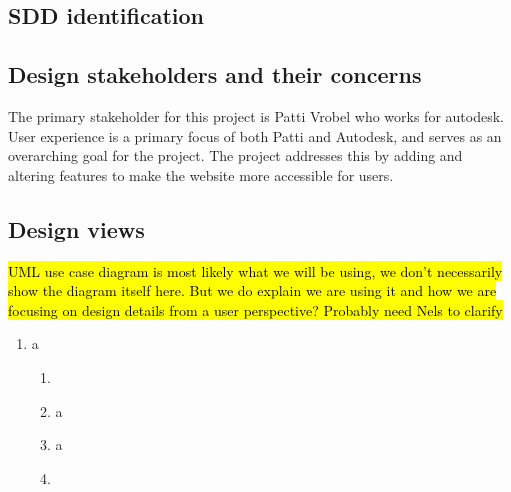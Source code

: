 \documentclass[letterpaper, 10pt, draftclsnofoot, compsoc, onecolumn]{IEEEtran}
\begin{document}
\subsection{SDD identification}
	\begin{description}
	\item{}
	\end{description}
\subsection{Design stakeholders and their concerns}
	The primary stakeholder for this project is Patti Vrobel who works for autodesk. User experience is a primary focus of both Patti and Autodesk, and serves as an overarching goal for the project. The project addresses this by adding and altering features to make the website more accessible for users.

\subsection{Design views}
	\hl{UML use case diagram is most likely what we will be using, we don't necessarily show the diagram itself here. But we do explain we are using it and how we are focusing on design details from a user perspective? Probably need Nels to clarify}
\begin{enumerate}
 		\item{a}
 			\begin{enumerate}
 				\item{}
 				\item{a}
 				\item{a}
 				\item{}
 			\end{enumerate}
 	\end{enumerate}
\end{document}
